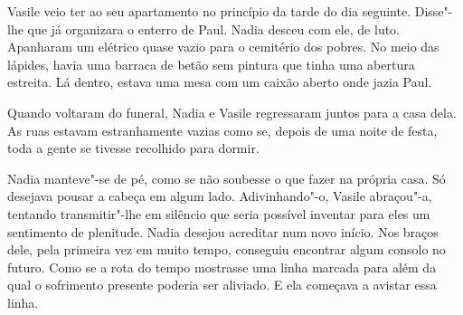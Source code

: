 Vasile veio ter ao seu apartamento no princípio da tarde
do dia seguinte. Disse"-lhe que já organizara o enterro de Paul. Nadia
desceu com ele, de luto. Apanharam um elétrico quase vazio para o
cemitério dos pobres. No meio das lápides, havia uma barraca de betão
sem pintura que tinha uma abertura estreita. Lá dentro, estava uma mesa
com um caixão aberto onde jazia Paul.

Quando voltaram do funeral, Nadia e Vasile regressaram juntos para a
casa dela. As ruas estavam estranhamente vazias como se, depois de uma noite de festa, toda a gente se
tivesse recolhido para dormir.

Nadia manteve"-se de pé, como se não soubesse o que fazer na própria
casa. Só desejava pousar a cabeça em algum lado. Adivinhando"-o, Vasile
abraçou"-a, tentando transmitir"-lhe em silêncio que seria possível
inventar para eles um sentimento de plenitude. Nadia desejou acreditar
num novo início. Nos braços dele, pela primeira vez em muito tempo,
conseguiu encontrar algum consolo no futuro. Como se a rota do tempo
mostrasse uma linha marcada para além da qual o sofrimento presente
poderia ser aliviado. E ela começava a avistar essa linha.
